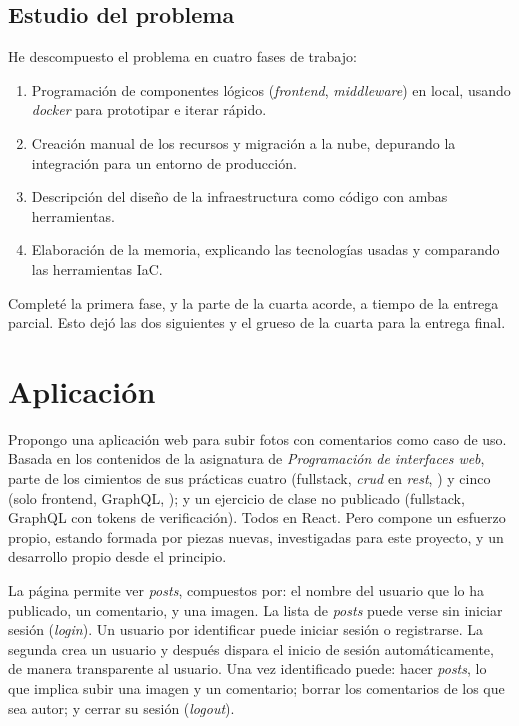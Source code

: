 \documentclass[11pt]{article}
\begin{document}
\begin{flushleft}
    \bigskip
    \bigskip
    \subsection{Estudio del problema}
	He descompuesto el problema en cuatro fases de trabajo:
		\begin{enumerate}
			\itemsep0em 
			\item Programación de componentes lógicos (\textit{\gls{frontend}}, \textit{\gls{middleware}}) en local, usando \textit{\gls{docker}} para prototipar e iterar rápido.
			\item Creación manual de los recursos y migración a la nube, depurando la integración para un entorno de producción.
			\item Descripción del diseño de la infraestructura como código con ambas herramientas.
            \item Elaboración de la memoria, explicando las tecnologías usadas y comparando las herramientas IaC.
		\end{enumerate}

    Completé la primera fase, y la parte de la cuarta acorde, a tiempo de la entrega parcial. Esto dejó las dos siguientes y el grueso de la cuarta para la entrega final.
    












\clearpage
\section{Aplicación}
Propongo una aplicación web para subir fotos con comentarios como caso de uso. Basada en los contenidos de la asignatura de \textit{Programación de interfaces web}, parte de los cimientos de sus prácticas cuatro (fullstack, \textit{\acrshort{crud}} en \textit{\acrshort{rest}}, \cite{misgit1}) y cinco (solo frontend, GraphQL, \cite{misgit2}); y un ejercicio de clase no publicado (fullstack, GraphQL con tokens de verificación). Todos en React. Pero compone un esfuerzo propio, estando formada por piezas nuevas, investigadas para este proyecto, y un desarrollo propio desde el principio.
\linebreak

La página permite ver \textit{posts}, compuestos por: el nombre del usuario que lo ha publicado, un comentario, y una imagen. La lista de \textit{posts} puede verse sin iniciar sesión (\textit{login}). Un usuario por identificar puede iniciar sesión o registrarse. La segunda crea un usuario y después dispara el inicio de sesión automáticamente, de manera transparente al usuario. Una vez identificado puede: hacer \textit{posts}, lo que implica subir una imagen y un comentario; borrar los comentarios de los que sea autor; y cerrar su sesión (\textit{logout}). 
\linebreak 


\end{flushleft}
\end{document}
